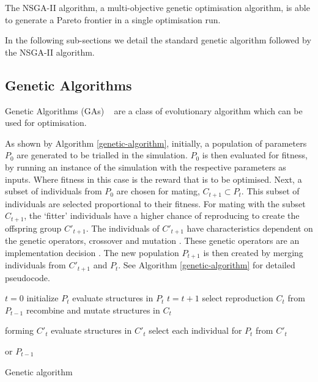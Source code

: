 \documentclass[sigconf]{acmart}
\begin{document}
The NSGA-II algorithm, a multi-objective genetic optimisation algorithm, is able to generate a Pareto frontier in a single optimisation run. 

In the following sub-sections we detail the standard genetic algorithm followed by the NSGA-II algorithm.

\subsection{Genetic Algorithms}

Genetic Algorithms (GAs) ~\cite{Holland1975} are a class of evolutionary algorithm which can be used for optimisation. 

As shown by Algorithm \ref{genetic-algorithm}, initially, a population of parameters $P_{0}$ are generated to be trialled in the simulation. $P_{0}$ is then evaluated for fitness, by running an instance of the simulation with the respective parameters as inputs. Where fitness in this case is the reward that is to be optimised. Next, a subset of individuals from $P_{0}$ are chosen for mating, $C_{t+1} \subset P_{t}$. This subset of individuals are selected proportional to their fitness. For mating with the subset $C_{t+1}$, the `fitter' individuals have a higher chance of reproducing to create the offspring group $C'_{t+1}$. The individuals of $C'_{t+1}$ have characteristics dependent on the genetic operators, crossover and mutation \cite{mitchell1998introduction}. These genetic operators are an implementation decision \cite{FogelDavidB2009}. The new population $P_{t+1}$ is then created by merging individuals from $C'_{t+1}$ and $P_{t}$. See Algorithm \ref{genetic-algorithm} for detailed pseudocode.
%
\begin{algorithm}[t]
\begin{algorithmic}[1]
\State $t=0$
\State initialize $P_{t}$
\State evaluate structures in $P_{t}$
\State $t=t+1$
\State select reproduction $C_{t}$ from $P_{t-1}$
\State recombine and mutate structures in $C_{t}$

forming $C'_{t}$
\State evaluate structures in $C'_{t}$
\State select each individual for $P_{t}$ from $C'_{t}$ 

or $P_{t-1}$
\EndWhile
\caption{Genetic algorithm \cite{FogelDavidB2009}}
\label{genetic-algorithm}
\end{algorithmic}
\end{algorithm}

\end{document}
